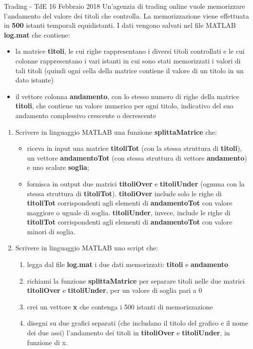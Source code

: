 \documentclass[format=169, 10pt, handout]{beamer}
\begin{document}
\begin{frame}[allowframebreaks]{Trading - TdE 16 Febbraio 2018}
Un’agenzia di trading online vuole memorizzare l’andamento del valore dei titoli che controlla.
La memorizzazione viene effettuata in \textbf{500} istanti temporali equidistanti.
I dati vengono salvati nel file MATLAB \textbf{log.mat} che contiene:
\begin{itemize}
\item la matrice \textbf{titoli}, le cui righe rappresentano i diversi titoli controllati e le cui colonne rappresentano i vari istanti in cui sono stati memorizzati i valori di tali titoli (quindi ogni cella della matrice contiene il valore di un titolo in un dato istante)
\item il vettore colonna \textbf{andamento}, con lo stesso numero di righe della matrice \textbf{titoli}, che contiene un valore numerico per ogni titolo, indicativo del suo andamento complessivo crescente o decrescente
\end{itemize}

\framebreak
\begin{enumerate}
\item Scrivere in linguaggio MATLAB una funzione \textbf{splittaMatrice} che:
\begin{itemize}
	\item riceva in input una matrice \textbf{titoliTot} (con la stessa struttura di \textbf{titoli}), un vettore \textbf{andamentoTot} (con stessa struttura di vettore \textbf{andamento}) e uno scalare \textbf{soglia};
	\item fornisca in output due matrici \textbf{titoliOver} e \textbf{titoliUnder} (ognuna con la stessa struttura di \textbf{titoliTot}). \textbf{titoliOver} include solo le righe di \textbf{titoliTot} corrispondenti agli elementi di \textbf{andamentoTot} con valore maggiore o uguale di soglia. \textbf{titoliUnder}, invece, include le righe di \textbf{titoliTot} corrispondenti agli elementi di \textbf{andamentoTot} con valore minori di soglia.
\end{itemize}

\framebreak
\item Scrivere in linguaggio MATLAB uno script che:
\begin{enumerate}
	\item legga dal file \textbf{log.mat} i due dati memorizzati: \textbf{titoli} e \textbf{andamento}
	\item richiami la funzione \textbf{splittaMatrice} per separare titoli nelle due matrici \textbf{titoliOver} e \textbf{titoliUnder}, per un valore di soglia pari a 0
	\item crei un vettore \textbf{x} che contenga i 500 istanti di memorizzazione 
	\item disegni su due grafici separati (che includano il titolo del grafico e il nome dei due assi) l’andamento dei titoli in \textbf{titoliOver} e \textbf{titoliUnder}, in funzione di x.
\end{enumerate}
\end{enumerate}
\end{frame}
\end{document}
